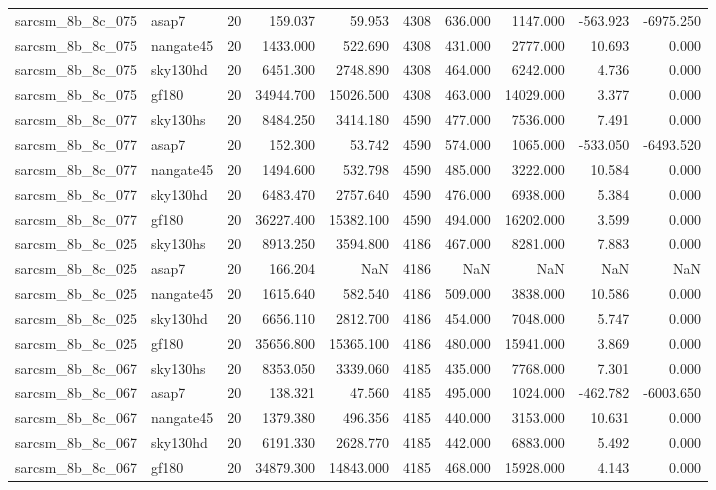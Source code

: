 \documentclass{article}
\begin{document}
\begin{longtable}{llrrrrrrrr}
sarcsm\_8b\_8c\_075 & asap7 & 20 & 159.037 & 59.953 & 4308 & 636.000 & 1147.000 & -563.923 & -6975.250 \\
sarcsm\_8b\_8c\_075 & nangate45 & 20 & 1433.000 & 522.690 & 4308 & 431.000 & 2777.000 & 10.693 & 0.000 \\
sarcsm\_8b\_8c\_075 & sky130hd & 20 & 6451.300 & 2748.890 & 4308 & 464.000 & 6242.000 & 4.736 & 0.000 \\
sarcsm\_8b\_8c\_075 & gf180 & 20 & 34944.700 & 15026.500 & 4308 & 463.000 & 14029.000 & 3.377 & 0.000 \\
sarcsm\_8b\_8c\_077 & sky130hs & 20 & 8484.250 & 3414.180 & 4590 & 477.000 & 7536.000 & 7.491 & 0.000 \\
sarcsm\_8b\_8c\_077 & asap7 & 20 & 152.300 & 53.742 & 4590 & 574.000 & 1065.000 & -533.050 & -6493.520 \\
sarcsm\_8b\_8c\_077 & nangate45 & 20 & 1494.600 & 532.798 & 4590 & 485.000 & 3222.000 & 10.584 & 0.000 \\
sarcsm\_8b\_8c\_077 & sky130hd & 20 & 6483.470 & 2757.640 & 4590 & 476.000 & 6938.000 & 5.384 & 0.000 \\
sarcsm\_8b\_8c\_077 & gf180 & 20 & 36227.400 & 15382.100 & 4590 & 494.000 & 16202.000 & 3.599 & 0.000 \\
sarcsm\_8b\_8c\_025 & sky130hs & 20 & 8913.250 & 3594.800 & 4186 & 467.000 & 8281.000 & 7.883 & 0.000 \\
sarcsm\_8b\_8c\_025 & asap7 & 20 & 166.204 & NaN & 4186 & NaN & NaN & NaN & NaN \\
sarcsm\_8b\_8c\_025 & nangate45 & 20 & 1615.640 & 582.540 & 4186 & 509.000 & 3838.000 & 10.586 & 0.000 \\
sarcsm\_8b\_8c\_025 & sky130hd & 20 & 6656.110 & 2812.700 & 4186 & 454.000 & 7048.000 & 5.747 & 0.000 \\
sarcsm\_8b\_8c\_025 & gf180 & 20 & 35656.800 & 15365.100 & 4186 & 480.000 & 15941.000 & 3.869 & 0.000 \\
sarcsm\_8b\_8c\_067 & sky130hs & 20 & 8353.050 & 3339.060 & 4185 & 435.000 & 7768.000 & 7.301 & 0.000 \\
sarcsm\_8b\_8c\_067 & asap7 & 20 & 138.321 & 47.560 & 4185 & 495.000 & 1024.000 & -462.782 & -6003.650 \\
sarcsm\_8b\_8c\_067 & nangate45 & 20 & 1379.380 & 496.356 & 4185 & 440.000 & 3153.000 & 10.631 & 0.000 \\
sarcsm\_8b\_8c\_067 & sky130hd & 20 & 6191.330 & 2628.770 & 4185 & 442.000 & 6883.000 & 5.492 & 0.000 \\
sarcsm\_8b\_8c\_067 & gf180 & 20 & 34879.300 & 14843.000 & 4185 & 468.000 & 15928.000 & 4.143 & 0.000 \\

\end{longtable}
\end{document}

